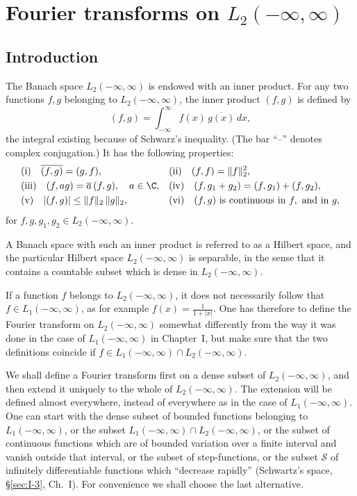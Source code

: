\chapter{Fourier transforms on \texorpdfstring{$L_2(-\infty,\infty)$}{L2(-infinity, infinity)}}
\label{ch:II}

\setcounter{section}{0}
\section{Introduction}
\label{sec:II-1}

The Banach space $L_{2}(-\infty,\infty)$ is endowed with an inner product. For any two functions $f,g$ belonging to $L_{2}(-\infty,\infty)$, the inner product $(f,g)$ is defined by
\begin{equation}\tag{1.1}\label{eq:II-1.1}
(f,g)=\int_{-\infty}^{\infty}f(x)\,\overline{g(x)}\,dx,
\end{equation}
the integral existing because of Schwarz's inequality. (The bar ``--'' denotes complex conjugation.) It has the following properties:
\begin{align*}
&\text{(i)}\quad \overline{(f,g)}=(g,f), && \text{(ii)}\quad (f,f)=\|f\|_{2}^{2},\\
&\text{(iii)}\quad (f,ag)=\overline{a}\,(f,g),\quad a\in\C, && \text{(iv)}\quad (f,g_{1}+g_{2})=(f,g_{1})+(f,g_{2}),\\
&\text{(v)}\quad |(f,g)|\le \|f\|_{2}\,\|g\|_{2}, && \text{(vi)}\quad (f,g)\text{ is continuous in }f,\text{ and in }g,
\end{align*}
for $f,g,g_{1},g_{2}\in L_{2}(-\infty,\infty)$.

A Banach space with such an inner product is referred to as a Hilbert space, and the particular Hilbert space $L_{2}(-\infty,\infty)$ is separable, in the sense that it contains a countable subset which is dense in $L_{2}(-\infty,\infty)$.

If a function $f$ belongs to $L_{2}(-\infty,\infty)$, it does not necessarily follow that $f\in L_{1}(-\infty,\infty)$, as for example $f(x)=\frac{1}{1+|x|}$. One has therefore to define the Fourier transform on $L_{2}(-\infty,\infty)$ somewhat differently from the way it was done in the case of $L_{1}(-\infty,\infty)$ in Chapter~I, but make sure that the two definitions coincide if $f\in L_{1}(-\infty,\infty)\cap L_{2}(-\infty,\infty)$.

We shall define a Fourier transform first on a dense subset of $L_{2}(-\infty,\infty)$, and then extend it uniquely to the whole of $L_{2}(-\infty,\infty)$. The extension will be defined almost everywhere, instead of everywhere as in the case of $L_{1}(-\infty,\infty)$. One can start with the dense subset of bounded functions belonging to $L_{1}(-\infty,\infty)$, or the subset $L_{1}(-\infty,\infty)\cap L_{2}(-\infty,\infty)$, or the subset of continuous functions which are of bounded variation over a finite interval and vanish outside that interval, or the subset of step-functions, or the subset $\mathcal S$ of infinitely differentiable functions which ``decrease rapidly'' (Schwartz's space, \S\ref{sec:I-3}, Ch.~I). For convenience we shall choose the last alternative.

